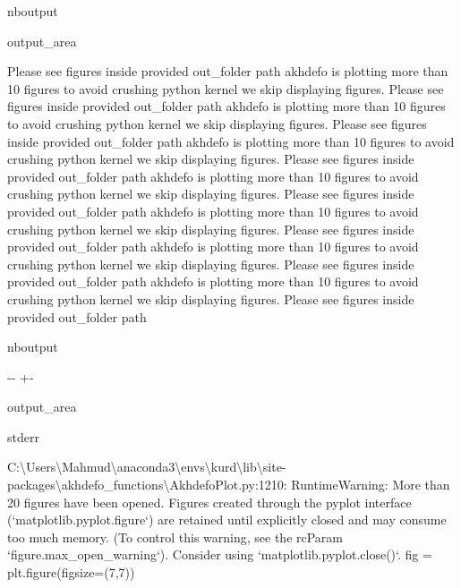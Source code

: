 \documentclass[letterpaper,10pt]{sphinxmanual}
\newlength\nbsphinxcodecellspacing
\begin{document}
\begin{sphinxuseclass}{nboutput}
{\begin{sphinxuseclass}{output_area}
\begin{sphinxuseclass}{}
\begin{sphinxVerbatim}[commandchars=\\\{\}]
 Please see figures inside provided out\_folder path
akhdefo is plotting more than 10 figures to avoid crushing python kernel we skip displaying figures.
 Please see figures inside provided out\_folder path
akhdefo is plotting more than 10 figures to avoid crushing python kernel we skip displaying figures.
 Please see figures inside provided out\_folder path
akhdefo is plotting more than 10 figures to avoid crushing python kernel we skip displaying figures.
 Please see figures inside provided out\_folder path
akhdefo is plotting more than 10 figures to avoid crushing python kernel we skip displaying figures.
 Please see figures inside provided out\_folder path
akhdefo is plotting more than 10 figures to avoid crushing python kernel we skip displaying figures.
 Please see figures inside provided out\_folder path
akhdefo is plotting more than 10 figures to avoid crushing python kernel we skip displaying figures.
 Please see figures inside provided out\_folder path
akhdefo is plotting more than 10 figures to avoid crushing python kernel we skip displaying figures.
 Please see figures inside provided out\_folder path
\end{sphinxVerbatim}



\end{sphinxuseclass}
\end{sphinxuseclass}
}

\end{sphinxuseclass}
\begin{sphinxuseclass}{nboutput}
{

\kern-\sphinxverbatimsmallskipamount\kern-\baselineskip
\kern+\FrameHeightAdjust\kern-\fboxrule
\vspace{\nbsphinxcodecellspacing}

\begin{sphinxuseclass}{output_area}
\begin{sphinxuseclass}{stderr}


\begin{sphinxVerbatim}[commandchars=\\\{\}]
C:\textbackslash{}Users\textbackslash{}Mahmud\textbackslash{}anaconda3\textbackslash{}envs\textbackslash{}kurd\textbackslash{}lib\textbackslash{}site-packages\textbackslash{}akhdefo\_functions\textbackslash{}AkhdefoPlot.py:1210: RuntimeWarning: More than 20 figures have been opened. Figures created through the pyplot interface (`matplotlib.pyplot.figure`) are retained until explicitly closed and may consume too much memory. (To control this warning, see the rcParam `figure.max\_open\_warning`). Consider using `matplotlib.pyplot.close()`.
  fig = plt.figure(figsize=(7,7))
\end{sphinxVerbatim}



\end{sphinxuseclass}
\end{sphinxuseclass}
}

\end{sphinxuseclass}
\end{document}

